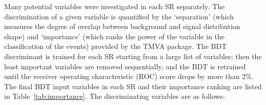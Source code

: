 Many potential variables were investigated in each SR separately. The discrimination of a given variable is quantified by the `separation' (which measures the degree of overlap between background and signal distribution shape) and `importance' (which ranks the power of the variable in the classification of the events) provided by the TMVA package. %
The BDT discriminant is trained for each SR starting from a large list of variables; then the least important variables are removed sequentially, and the BDT is retrained until the
receiver operating characteristic (ROC) score drops by more than 2\%.
The final BDT input variables in each SR and their importance ranking are listed in Table~\ref{tab:importance}. The discriminating variables are as follows:
